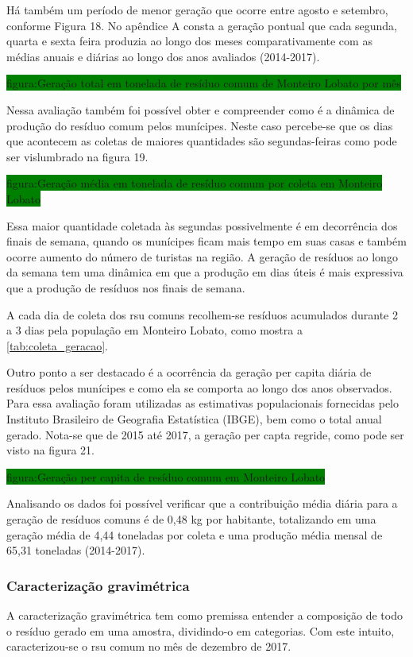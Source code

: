 	Há também um período de menor geração que ocorre entre agosto e setembro, conforme Figura 18. No apêndice A consta a geração pontual que cada segunda, quarta e sexta feira produzia ao longo dos meses comparativamente com as médias anuais e diárias ao longo dos anos avaliados (2014-2017).
	
	\colorbox{green}{figura:Geração total em tonelada de resíduo comum de Monteiro Lobato por mês}
	
	Nessa avaliação também foi possível obter e compreender como é a dinâmica de produção do resíduo comum pelos munícipes. Neste caso percebe-se que os dias que acontecem as coletas de maiores quantidades são segundas-feiras como pode ser vislumbrado na figura 19.
	
	\colorbox{green}{figura:Geração média em tonelada de resíduo comum por coleta em Monteiro Lobato}
	
	Essa maior quantidade coletada às segundas possivelmente é em decorrência dos finais de semana, quando os munícipes ficam mais tempo em suas casas e também ocorre aumento do número de turistas na região. A geração de resíduos ao longo da semana tem uma dinâmica em que a produção em dias úteis é mais expressiva que a produção de resíduos nos finais de semana.
	
	A cada dia de coleta dos \gls{rsu} comuns recolhem-se resíduos acumulados durante 2 a 3 dias pela população em Monteiro Lobato, como mostra a \autoref{tab:coleta_geracao}.
	
	

	Outro ponto a ser destacado é a ocorrência da geração per capita diária de resíduos pelos munícipes e como ela se comporta ao longo dos anos observados. Para essa avaliação foram utilizadas as estimativas populacionais fornecidas pelo Instituto Brasileiro de Geografia Estatística (IBGE), bem como o total anual gerado. Nota-se que de 2015 até 2017, a geração per capta regride, como pode ser visto na figura 21.
	
	\colorbox{green}{figura:Geração per capita de resíduo comum em Monteiro Lobato}
	
	Analisando os dados foi possível verificar que a contribuição média diária para a geração de resíduos comuns é de 0,48 kg por habitante, totalizando em uma geração média de 4,44 toneladas por coleta e uma produção média mensal de 65,31 toneladas (2014-2017).
	
	\subsubsection{Caracterização gravimétrica} 	
	A caracterização gravimétrica tem como premissa entender a composição de todo o resíduo gerado em uma amostra, dividindo-o em categorias. Com este intuito, caracterizou-se o \gls{rsu} comum no mês de dezembro de 2017.
	
